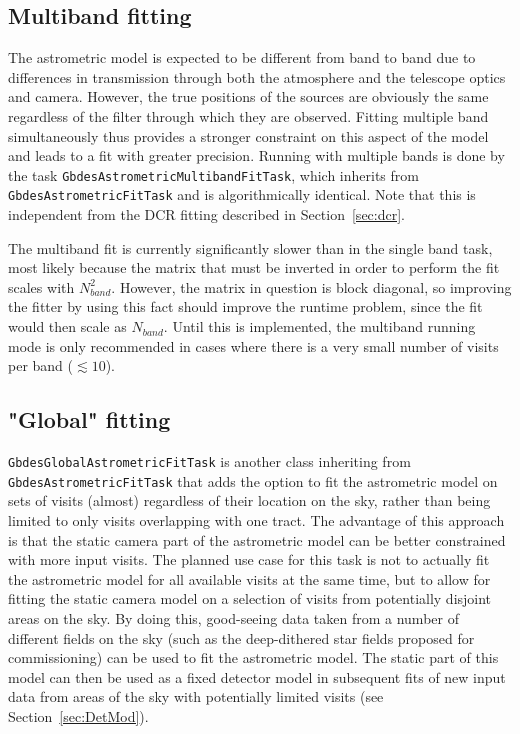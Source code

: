 \documentclass[DM,authoryear,toc]{lsstdoc}
\begin{document}
\subsection{Multiband fitting}
The astrometric model is expected to be different from band to band due to differences in transmission through both the atmosphere and the telescope optics and camera. However, the true positions of the sources are obviously the same regardless of the filter through which they are observed. Fitting multiple band simultaneously thus provides a stronger constraint on this aspect of the model and leads to a fit with greater precision. Running with multiple bands is done by the task \texttt{GbdesAstrometricMultibandFitTask}, which inherits from \texttt{GbdesAstrometricFitTask} and is algorithmically identical. Note that this is independent from the DCR fitting described in Section~\ref{sec:dcr}.

The multiband fit is currently significantly slower than in the single band task, most likely because the matrix that must be inverted in order to perform the fit scales with $N_{band}^2$. However, the matrix in question is block diagonal, so improving the fitter by using this fact should improve the runtime problem, since the fit would then scale as $N_{band}$. Until this is implemented, the multiband running mode is only recommended in cases where there is a very small number of visits per band ($\lesssim10$).

\subsection{"Global" fitting}
\texttt{GbdesGlobalAstrometricFitTask} is another class inheriting from \texttt{GbdesAstrometricFitTask} that adds the option to fit the astrometric model on sets of visits (almost) regardless of their location on the sky, rather than being limited to only visits overlapping with one tract. The advantage of this approach is that the static camera part of the astrometric model can be better constrained with more input visits. The planned use case for this task is not to actually fit the astrometric model for all available visits at the same time, but to allow for fitting the static camera model on a selection of visits from potentially disjoint areas on the sky. By doing this, good-seeing data taken from a number of different fields on the sky (such as the deep-dithered star fields proposed for commissioning) can be used to fit the astrometric model. The static part of this model can then be used as a fixed detector model in subsequent fits of new input data from areas of the sky with potentially limited visits (see Section~\ref{sec:DetMod}).
\end{document}
